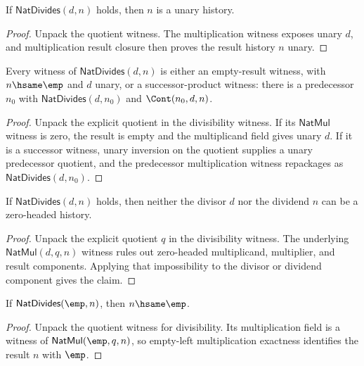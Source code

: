 \begin{theorem}
\label{thm:nat-divides-result-unary}
If $\mathsf{NatDivides}(d,n)$ holds, then $n$ is a unary history.
\end{theorem}
\begin{proof}
Unpack the quotient witness. The multiplication witness exposes unary $d$,
and multiplication result closure then proves the result history $n$ unary.
\end{proof}

\begin{lemma}
\label{lem:nat-divides-result-cases}
Every witness of \(\mathsf{NatDivides}(d,n)\) is either an empty-result
witness, with \(n\hsame\emp\) and \(d\) unary, or a successor-product witness:
there is a predecessor \(n_0\) with \(\mathsf{NatDivides}(d,n_0)\) and
\(\Cont(n_0,d,n)\).
\end{lemma}
\begin{proof}
Unpack the explicit quotient in the divisibility witness. If its
\(\mathsf{NatMul}\) witness is zero, the result is empty and the multiplicand
field gives unary \(d\). If it is a successor witness, unary inversion on the
quotient supplies a unary predecessor quotient, and the predecessor
multiplication witness repackages as \(\mathsf{NatDivides}(d,n_0)\).
\end{proof}

\begin{theorem}
\label{thm:nat-divides-zero-headed-component-absurd}
If \(\mathsf{NatDivides}(d,n)\) holds, then neither the divisor \(d\) nor the
dividend \(n\) can be a zero-headed history.
\end{theorem}
\begin{proof}
Unpack the explicit quotient \(q\) in the divisibility witness. The underlying
\(\mathsf{NatMul}(d,q,n)\) witness rules out zero-headed multiplicand,
multiplier, and result components. Applying that impossibility to the divisor
or dividend component gives the claim.
\end{proof}

\begin{lemma}
\label{lem:natdivides-empty-left-result-empty}
If \(\mathsf{NatDivides}(\emp,n)\), then \(n\hsame\emp\).
\end{lemma}
\begin{proof}
Unpack the quotient witness for divisibility. Its multiplication field is a
witness of \(\mathsf{NatMul}(\emp,q,n)\), so empty-left multiplication
exactness identifies the result \(n\) with \(\emp\).
\end{proof}


